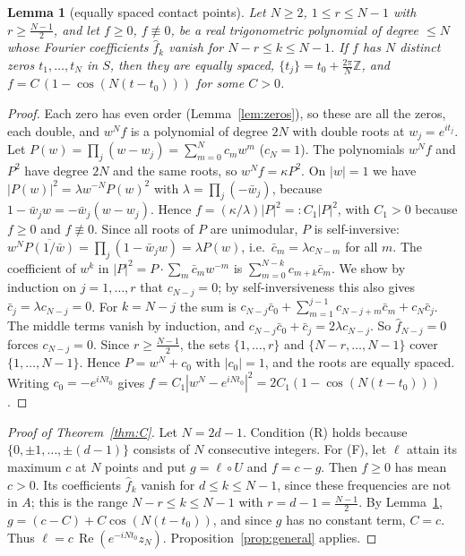 \documentclass[11pt]{amsart}
\newtheorem{lemma}[theorem]{Lemma}
\theoremstyle{remark}
\newcommand{\Z}{\mathbb{Z}}
\newcommand{\re}{\operatorname{Re}}
\begin{document}
\begin{lemma}[equally spaced contact points]\label{lem:gap}
Let $N\ge2$, $1\le r\le N-1$ with $r\ge\frac{N-1}2$, and let $f\ge0$, $f\not\equiv0$, be a real trigonometric polynomial of degree $\le N$ whose Fourier coefficients $\hat f_k$
vanish for $N-r\le k\le N-1$. If $f$ has $N$ distinct zeros $t_1,\dots,t_N$ in $S$, then they are equally spaced, $\{t_j\}=t_0+\frac{2\pi}N\Z$, and
$f=C\,(1-\cos(N(t-t_0)))$ for some $C>0$.
\end{lemma}
\begin{proof}
Each zero has even order (Lemma~\ref{lem:zeros}), so these are all the zeros, each double, and $w^Nf$ is a polynomial of degree $2N$ with double roots at
$w_j=e^{it_j}$. Let $P(w)=\prod_j(w-w_j)=\sum_{m=0}^Nc_mw^m$ ($c_N=1$). The polynomials $w^Nf$ and $P^2$ have degree $2N$ and the same roots, so $w^Nf=\kappa P^2$.
On $|w|=1$ we have $|P(w)|^2=\lambda w^{-N}P(w)^2$ with $\lambda=\prod_j(-\bar w_j)$, because $1-\bar w_jw=-\bar w_j(w-w_j)$. Hence $f=(\kappa/\lambda)|P|^2=:C_1|P|^2$, with $C_1>0$ because $f\ge0$ and $f\not\equiv0$.
Since all roots of $P$ are unimodular, $P$ is self-inversive: $w^N\overline{P(1/\bar w)}=\prod_j(1-\bar w_jw)=\lambda P(w)$, i.e.\ $\bar c_m=\lambda c_{N-m}$ for all $m$.
The coefficient of $w^k$ in $|P|^2=P\cdot\sum_m\bar c_mw^{-m}$ is $\sum_{m=0}^{N-k}c_{m+k}\bar c_m$. We show by induction on $j=1,\dots,r$ that $c_{N-j}=0$; by self-inversiveness this also gives $\bar c_j=\lambda c_{N-j}=0$.
For $k=N-j$ the sum is $c_{N-j}\bar c_0+\sum_{m=1}^{j-1}c_{N-j+m}\bar c_m+c_N\bar c_j$. The middle terms vanish by induction, and $c_{N-j}\bar c_0+\bar c_j=2\lambda c_{N-j}$. So $\hat f_{N-j}=0$ forces
$c_{N-j}=0$. Since $r\ge\frac{N-1}2$, the sets $\{1,\dots,r\}$ and $\{N-r,\dots,N-1\}$ cover $\{1,\dots,N-1\}$. Hence $P=w^N+c_0$ with $|c_0|=1$, and the roots are equally spaced.
Writing $c_0=-e^{iNt_0}$ gives $f=C_1|w^N-e^{iNt_0}|^2=2C_1(1-\cos(N(t-t_0)))$.
\end{proof}

\begin{proof}[Proof of Theorem~\ref{thm:C}]
Let $N=2d-1$. Condition (R) holds because $\{0,\pm1,\dots,\pm(d-1)\}$ consists of $N$ consecutive integers. For (F), let $\ell$ attain its maximum $c$ at $N$ points and put
$g=\ell\circ U$ and $f=c-g$. Then $f\ge0$ has mean $c>0$. Its coefficients $\hat f_k$ vanish for $d\le k\le N-1$, since these frequencies are not in $A$; this is the range
$N-r\le k\le N-1$ with $r=d-1=\frac{N-1}2$. By Lemma~\ref{lem:gap}, $g=(c-C)+C\cos(N(t-t_0))$, and since $g$ has no constant term, $C=c$. Thus $\ell=c\,\re(e^{-iNt_0}z_N)$.
Proposition~\ref{prop:general} applies.
\end{proof}
\end{document}
